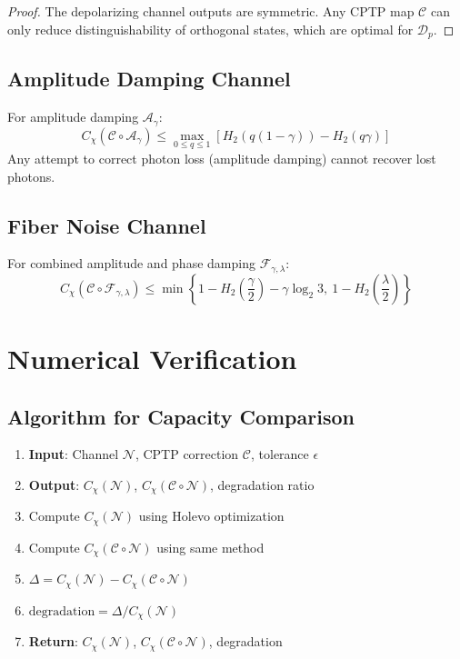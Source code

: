 \documentclass[12pt]{article}
\begin{document}
\begin{proof}
The depolarizing channel outputs are symmetric. Any CPTP map $\mathcal{C}$ can only reduce distinguishability of orthogonal states, which are optimal for $\mathcal{D}_p$.
\end{proof}

\subsection{Amplitude Damping Channel}
For amplitude damping $\mathcal{A}_\gamma$:
\[
C_{\chi}(\mathcal{C} \circ \mathcal{A}_\gamma) \leq \max_{0 \leq q \leq 1} \left[ H_2(q(1-\gamma)) - H_2(q\gamma) \right]
\]
Any attempt to correct photon loss (amplitude damping) cannot recover lost photons.

\subsection{Fiber Noise Channel}
For combined amplitude and phase damping $\mathcal{F}_{\gamma,\lambda}$:
\begin{equation}
C_{\chi}(\mathcal{C} \circ \mathcal{F}_{\gamma,\lambda}) \leq 
\min\left\{ 
1 - H_2\left(\frac{\gamma}{2}\right) - \gamma\log_2 3, \ 
1 - H_2\left(\frac{\lambda}{2}\right) 
\right\}
\end{equation}

\section{Numerical Verification}

\subsection{Algorithm for Capacity Comparison}
\begin{enumerate}
    \item \textbf{Input}: Channel $\mathcal{N}$, CPTP correction $\mathcal{C}$, tolerance $\epsilon$
    \item \textbf{Output}: $C_{\chi}(\mathcal{N})$, $C_{\chi}(\mathcal{C} \circ \mathcal{N})$, degradation ratio
    \item Compute $C_{\chi}(\mathcal{N})$ using Holevo optimization
    \item Compute $C_{\chi}(\mathcal{C} \circ \mathcal{N})$ using same method
    \item $\Delta = C_{\chi}(\mathcal{N}) - C_{\chi}(\mathcal{C} \circ \mathcal{N})$
    \item $\text{degradation} = \Delta / C_{\chi}(\mathcal{N})$
    \item \textbf{Return}: $C_{\chi}(\mathcal{N})$, $C_{\chi}(\mathcal{C} \circ \mathcal{N})$, degradation
\end{enumerate}
\end{document}
